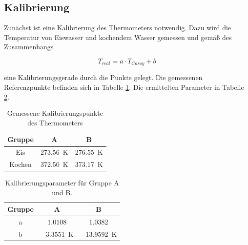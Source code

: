 \documentclass[12pt,a4paper]{article}
\begin{document}
\subsection{Kalibrierung}
Zunächst ist eine Kalibrierung des Thermometers notwendig. Dazu wird die Temperatur von Eiswasser und kochendem Wasser gemessen und gemäß des Zusammenhangs
 
\begin{equation}
T_{real} = a \cdot T_{Cassy} + b
\end{equation}

eine Kalibrierungsgerade durch die Punkte gelegt. Die gemessenen Referenzpunkte befinden sich in Tabelle \ref{tab:Kalibrierung}. Die ermittelten Parameter in Tabelle \ref{tab:Parameter}.

\begin{table}
	\centering
	\begin{tabular}{|c|c|c|}
		\hline
		Gruppe & A & B \\
		\hline
		Eis & \SI{273.56}{\K} & \SI{276.55}{K}\\
		\hline
		Kochen & \SI{372.50}{\K} & \SI{373.17}{K}\\
		\hline 
	\end{tabular}
	\caption{Gemessene Kalibrierungspunkte des Thermometers}
	\label{tab:Kalibrierung}
\end{table}

\begin{table}
	\centering
	\begin{tabular}{|c|c|c|}
		\hline
		Gruppe & A & B \\
		\hline
		a & $1.0108$ & 1.0382 \\
		\hline
		b & \SI{-3.3551}{\K} & \SI{-13.9592}{K} \\
		\hline
	\end{tabular}
	\caption{Kalibrierungsparameter für Gruppe A und B.}
	\label{tab:Parameter}
\end{table}
\end{document}
